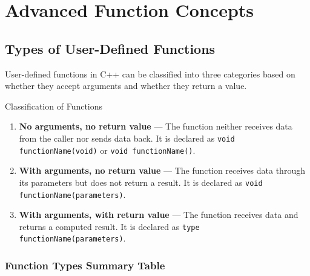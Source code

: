 
\chapter{Advanced Function Concepts}
\label{ch:advanced-functions}

\section{Types of User-Defined Functions}
\label{sec:function-types}

User-defined functions in C++ can be classified into three categories based on
whether they accept arguments and whether they return a value.

\begin{infobox}{Classification of Functions}
\begin{enumerate}
    \item \textbf{No arguments, no return value} --- The function neither
          receives data from the caller nor sends data back. It is declared
          as \texttt{void functionName(void)} or
          \texttt{void functionName()}.
    \item \textbf{With arguments, no return value} --- The function receives
          data through its parameters but does not return a result. It is
          declared as \texttt{void functionName(parameters)}.
    \item \textbf{With arguments, with return value} --- The function
          receives data and returns a computed result. It is declared as
          \texttt{type functionName(parameters)}.
\end{enumerate}
\end{infobox}

\subsection{Function Types Summary Table}

